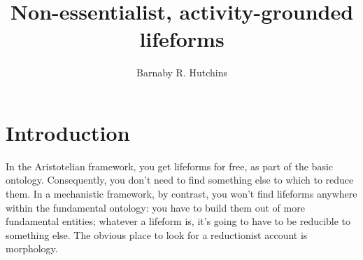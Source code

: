 \documentclass{simpleDoc}
\title{Non-essentialist, activity-grounded lifeforms}
\author{Barnaby R. Hutchins}
\begin{document}
\maketitle

\section{Introduction}
In the Aristotelian framework, you get lifeforms for free, as part of the basic ontology. Consequently, you don't need to find something else to which to reduce them. In a mechanistic framework, by contrast, you won't find lifeforms anywhere within the fundamental ontology: you have to build them out of more fundamental entities; whatever a lifeform is, it's going to have to be reducible to something else. The obvious place to look for a reductionist account is morphology.
\end{document}

